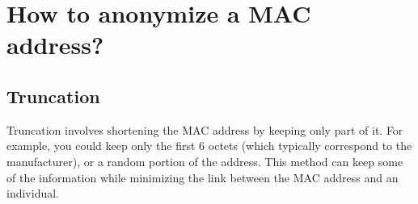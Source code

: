 \documentclass[aps,prb,twocolumn,superscriptaddress,floatfix,longbibliography,nofootinbib]{revtex4-2}
\begin{document}
\section{\label{sec:Methods}How to anonymize a MAC address?}
  \subsection{\label{subsec:Truncation}Truncation}



  Truncation involves shortening the MAC address by keeping only part of it.
  For example, you could keep only the first 6 octets (which typically correspond to the manufacturer),
  or a random portion of the address. This method can keep some of the information while minimizing 
  the link between the MAC address and an individual.
\end{document}
